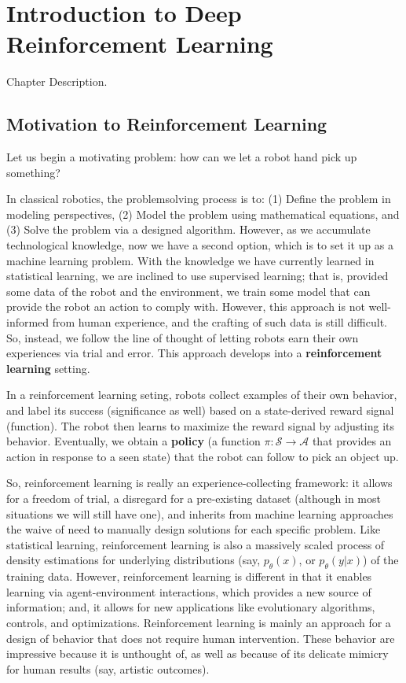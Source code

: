 \chapter{Introduction to Deep Reinforcement Learning}
Chapter Description.

\section{Motivation to Reinforcement Learning}
Let us begin a motivating problem: how can we let a robot hand pick up something?

In classical robotics, the problemsolving process is to: (1) Define the problem in modeling perspectives, (2) Model the problem using mathematical equations, and (3) Solve the problem via a designed algorithm.
However, as we accumulate technological knowledge, now we have a second option, which is to set it up as a machine learning problem.
With the knowledge we have currently learned in statistical learning, we are inclined to use supervised learning; that is, provided some data of the robot and the environment, we train some model that can provide the robot an action to comply with.
However, this approach is not well-informed from human experience, and the crafting of such data is still difficult.
So, instead, we follow the line of thought of letting robots earn their own experiences via trial and error.
This approach develops into a \textbf{reinforcement learning} setting.

In a reinforcement learning seting, robots collect examples of their own behavior, and label its success (significance as well) based on a state-derived reward signal (function).
The robot then learns to maximize the reward signal by adjusting its behavior.
Eventually, we obtain a \textbf{policy} (a function $\pi: \mathcal{S} \rightarrow \mathcal{A}$ that provides an action in response to a seen state) that the robot can follow to pick an object up.

So, reinforcement learning is really an experience-collecting framework: it allows for a freedom of trial, a disregard for a pre-existing dataset (although in most situations we will still have one), and inherits from machine learning approaches the waive of need to manually design solutions for each specific problem.
Like statistical learning, reinforcement learning is also a massively scaled process of density estimations for underlying distributions (say, $p_\theta (x)$, or $p_\theta(y|x)$) of the training data.
However, reinforcement learning is different in that it enables learning via agent-environment interactions, which provides a new source of information; and, it allows for new applications like evolutionary algorithms, controls, and optimizations.
Reinforcement learning is mainly an approach for a design of behavior that does not require human intervention.
These behavior are impressive because it is unthought of, as well as because of its delicate mimicry for human results (say, artistic outcomes).

